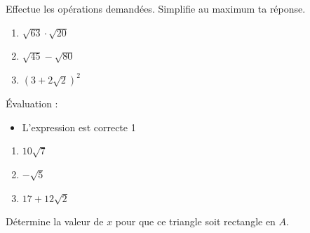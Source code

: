 \documentclass[a4paper, 12pt, parskip=half-, twoside=semi]{scrartcl}
\begin{document}
\begin{appliquer}[points=3]
    Effectue les opérations demandées. Simplifie au maximum ta réponse.
    \begin{enumerate}[cols=3]
        \item $\sqrt{63}\cdot\sqrt{20}$
        \item $\sqrt{45}-\sqrt{80}$
        \item $\left(3 + 2\sqrt{2}\right)^2$
    \end{enumerate}
\end{appliquer}
\begin{solution}
    Évaluation :
    \begin{itemize}
        \item L'expression est correcte \hfill 1
    \end{itemize}
    \begin{enumerate}[cols=3]
        \item $10 \sqrt{7}$
        \item $-\sqrt{5}$
        \item $17+12\sqrt{2}$
    \end{enumerate}
\end{solution}
\begin{transferer}[points=3]
    Détermine la valeur de \(x\) pour que ce triangle soit rectangle en \(A\).
    \begin{center}
        
    \end{center}
\end{transferer}
\end{document}
